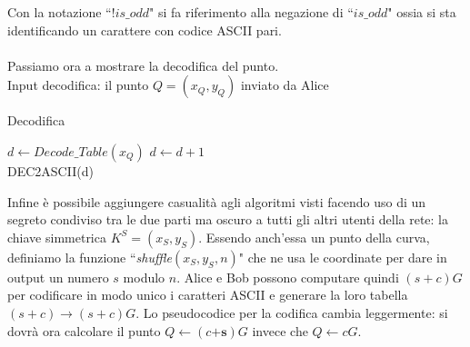 \documentclass[a4paper,12pt]{tesiinfo}
\begin{document}
%
%
%
%
%
%
Con la notazione ``$!is\_odd$" si fa riferimento alla negazione di ``$is\_odd$" ossia si sta identificando un carattere con codice ASCII pari.
\\
\\
Passiamo ora a mostrare la decodifica del punto.
\\
Input decodifica: il punto $Q = (x_Q, y_Q)$ inviato da Alice
\begin{algorithm}[H]
\caption{Decodifica}
\begin{algorithmic}
\State $d \gets Decode\_Table(x_Q)$ 
\State $d \gets d+1$
\EndIf\\
\Return DEC2ASCII(d) 
\end{algorithmic}
\end{algorithm}
Infine \`e possibile aggiungere casualit\`a agli algoritmi visti facendo uso di un segreto condiviso tra le due parti ma oscuro a tutti gli altri utenti della rete: la chiave simmetrica $K^S=(x_S, y_S)$. Essendo anch'essa un punto della curva, definiamo la funzione ``\textit{shuffle}$(x_S, y_S, n)$" che ne usa le coordinate per dare in output un numero $s$ modulo $n$. Alice e Bob possono computare quindi $(s+c)G$ per codificare in modo unico i caratteri ASCII e generare la loro tabella $(s+c) \to (s+c)G$. Lo pseudocodice per la codifica cambia leggermente: si dovr\`a ora calcolare il punto $Q \gets (c\mathbold{+s})G$ invece che $Q \gets cG$.
%
%
%
%
%
%
%
%
%
%
%
%
\end{document}
